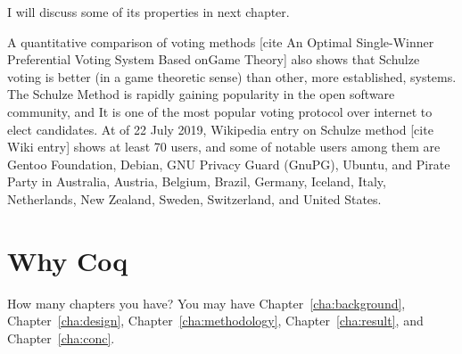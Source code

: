I will discuss some of its properties in next chapter. 


A  quantitative  comparison of voting methods 
[cite An Optimal Single-Winner Preferential Voting System Based onGame Theory]  also shows that 
Schulze voting is better (in a game theoretic sense) than other, more established, systems.  The 
Schulze Method is rapidly gaining popularity in the open software community, and It is one of the most 
popular voting protocol over internet to elect candidates. At of 22 July 2019, Wikipedia entry on Schulze 
method [cite Wiki entry] shows at least 70 users, and some of 
notable users among them are Gentoo Foundation, Debian, GNU Privacy Guard (GnuPG), Ubuntu, and 
Pirate Party in Australia, Austria, Belgium, Brazil, Germany, Iceland, Italy, 
Netherlands, New Zealand, Sweden, Switzerland, and United States.  






\section{Why Coq}
\label{sec:outline}
How many chapters you have? You may have Chapter~\ref{cha:background},
Chapter~\ref{cha:design}, Chapter~\ref{cha:methodology},
Chapter~\ref{cha:result}, and Chapter~\ref{cha:conc}.
